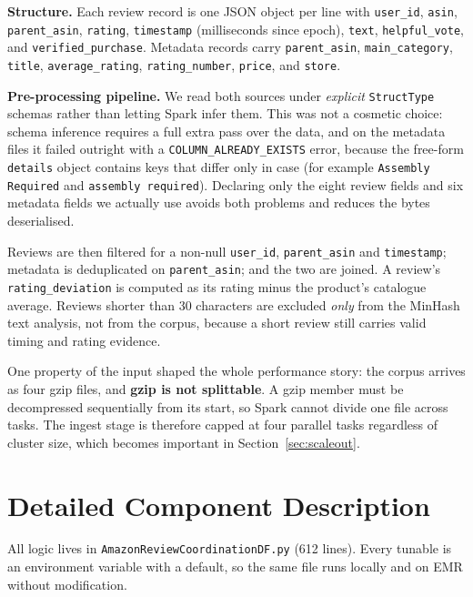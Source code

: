 \documentclass[12pt]{article}
\begin{document}
\textbf{Structure.} Each review record is one JSON object per line with
\texttt{user\_id}, \texttt{asin}, \texttt{parent\_asin}, \texttt{rating},
\texttt{timestamp} (milliseconds since epoch), \texttt{text},
\texttt{helpful\_vote}, and \texttt{verified\_purchase}. Metadata records carry
\texttt{parent\_asin}, \texttt{main\_category}, \texttt{title},
\texttt{average\_rating}, \texttt{rating\_number}, \texttt{price}, and
\texttt{store}.

\textbf{Pre-processing pipeline.} We read both sources under
\emph{explicit} \texttt{StructType} schemas rather than letting Spark infer
them. This was not a cosmetic choice: schema inference requires a full extra
pass over the data, and on the metadata files it failed outright with a
\texttt{COLUMN\_ALREADY\_EXISTS} error, because the free-form
\texttt{details} object contains keys that differ only in case (for example
\texttt{Assembly Required} and \texttt{assembly required}). Declaring only the
eight review fields and six metadata fields we actually use avoids both
problems and reduces the bytes deserialised.

Reviews are then filtered for a non-null \texttt{user\_id},
\texttt{parent\_asin} and \texttt{timestamp}; metadata is deduplicated on
\texttt{parent\_asin}; and the two are joined. A review's
\texttt{rating\_deviation} is computed as its rating minus the product's
catalogue average. Reviews shorter than 30 characters are excluded
\emph{only} from the MinHash text analysis, not from the corpus, because a
short review still carries valid timing and rating evidence.

One property of the input shaped the whole performance story: the corpus
arrives as four gzip files, and \textbf{gzip is not splittable}. A gzip member
must be decompressed sequentially from its start, so Spark cannot divide one
file across tasks. The ingest stage is therefore capped at four parallel tasks
regardless of cluster size, which becomes important in
Section~\ref{sec:scaleout}.

\section{Detailed Component Description}

All logic lives in \texttt{AmazonReviewCoordinationDF.py} (612 lines). Every
tunable is an environment variable with a default, so the same file runs
locally and on EMR without modification.
\end{document}
